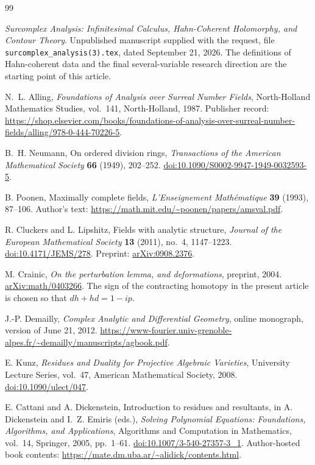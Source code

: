 \documentclass[11pt,letterpaper]{article}
\theoremstyle{definition}
\theoremstyle{remark}
\numberwithin{equation}{section}
\begin{document}
\begin{thebibliography}{99}

\emph{Surcomplex Analysis: Infinitesimal Calculus, Hahn-Coherent Holomorphy, and Contour Theory}.
Unpublished manuscript supplied with the request, file
\texttt{surcomplex\_analysis(3).tex}, dated September 21, 2026.
The definitions of Hahn-coherent data and the final several-variable research direction are the starting point of this article.

N.~L. Alling,
\emph{Foundations of Analysis over Surreal Number Fields},
North-Holland Mathematics Studies, vol.~141, North-Holland, 1987.
Publisher record: \url{https://shop.elsevier.com/books/foundations-of-analysis-over-surreal-number-fields/alling/978-0-444-70226-5}.

B.~H. Neumann,
On ordered division rings,
\emph{Transactions of the American Mathematical Society} \textbf{66} (1949), 202--252.
\href{https://doi.org/10.1090/S0002-9947-1949-0032593-5}{doi:10.1090/S0002-9947-1949-0032593-5}.

B. Poonen,
Maximally complete fields,
\emph{L'Enseignement Math\'ematique} \textbf{39} (1993), 87--106.
Author's text: \url{https://math.mit.edu/~poonen/papers/amsval.pdf}.

R. Cluckers and L. Lipshitz,
Fields with analytic structure,
\emph{Journal of the European Mathematical Society} \textbf{13} (2011), no.~4, 1147--1223.
\href{https://doi.org/10.4171/JEMS/278}{doi:10.4171/JEMS/278}.
Preprint: \href{https://arxiv.org/abs/0908.2376}{arXiv:0908.2376}.

M. Crainic,
\emph{On the perturbation lemma, and deformations},
preprint, 2004.
\href{https://arxiv.org/abs/math/0403266}{arXiv:math/0403266}.
The sign of the contracting homotopy in the present article is chosen so that $dh+hd=1-ip$.

J.-P. Demailly,
\emph{Complex Analytic and Differential Geometry},
online monograph, version of June 21, 2012.
\url{https://www-fourier.univ-grenoble-alpes.fr/~demailly/manuscripts/agbook.pdf}.

E. Kunz,
\emph{Residues and Duality for Projective Algebraic Varieties},
University Lecture Series, vol.~47, American Mathematical Society, 2008.
\href{https://doi.org/10.1090/ulect/047}{doi:10.1090/ulect/047}.

E. Cattani and A. Dickenstein,
Introduction to residues and resultants,
in A. Dickenstein and I.~Z. Emiris (eds.),
\emph{Solving Polynomial Equations: Foundations, Algorithms, and Applications},
Algorithms and Computation in Mathematics, vol.~14, Springer, 2005, pp.~1--61.
\href{https://doi.org/10.1007/3-540-27357-3_1}{doi:10.1007/3-540-27357-3\_1}.
Author-hosted book contents: \url{https://mate.dm.uba.ar/~alidick/contents.html}.


\end{thebibliography}
\end{document}
